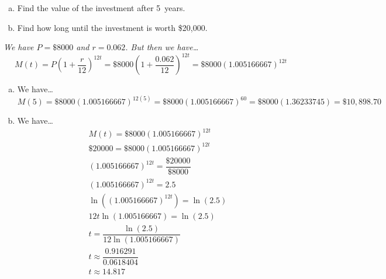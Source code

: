 \documentclass[12pt,letterpaper]{exam}
\begin{document}
\begin{questions}
\begin{enumerate}[(a)]
\item Find the value of the investment after 5~years.
\item Find how long until the investment is worth \$20,000. 
\end{enumerate} \pspace

{\itshape
\sol We have $P= \$8000$ and $r= 0.062$. But then we have\dots
	\[
	M(t)=  P \left(1 + \dfrac{r}{12} \right)^{12t}=  \$8000 \left(1 + \dfrac{0.062}{12} \right)^{12t}=  \$8000 (1.005166667)^{12t}
	\]

\begin{enumerate}[(a)]
\item We have\dots
	\[
	M(5)=  \$8000 (1.005166667)^{12(5)}=  \$8000 (1.005166667)^{60}= \$8000 (1.36233745)= \$10,\!898.70
	\] \pspace

\item We have\dots
	\[
	\begin{gathered}
	M(t)= \$8000 (1.005166667)^{12t} \\[0.3cm]
	\$20000= \$8000 (1.005166667)^{12t} \\[0.3cm]
	(1.005166667)^{12t}= \dfrac{\$20000}{\$8000} \\[0.3cm]
	(1.005166667)^{12t}= 2.5 \\[0.3cm]
	\ln \left( (1.005166667)^{12t} \right)= \ln(2.5) \\[0.3cm]
	12t \ln(1.005166667)= \ln(2.5) \\[0.3cm]
	t= \dfrac{\ln(2.5)}{12 \ln(1.005166667)} \\[0.3cm]
	t \approx \dfrac{0.916291}{0.0618404} \\[0.3cm]
	t \approx 14.817
	\end{gathered}
	\]
\end{enumerate}
}


\end{questions}
\end{document}
